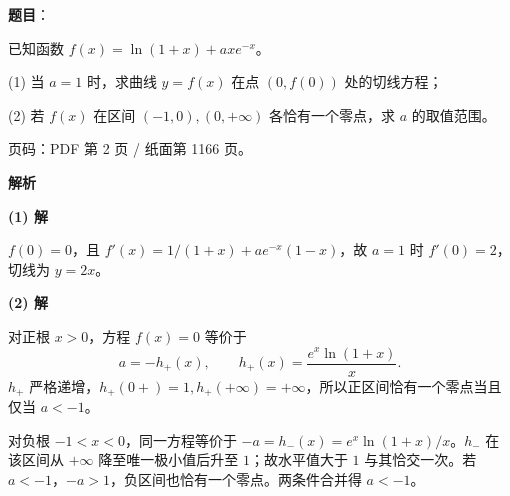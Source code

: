 \begin{answer}

\textbf{题目}：

已知函数 $f(x)=\ln(1+x)+axe^{-x}$。

  (1) 当 $a=1$ 时，求曲线 $y=f(x)$ 在点 $(0,f(0))$ 处的切线方程；

  (2) 若 $f(x)$ 在区间 $(-1,0),(0,+\infty)$ 各恰有一个零点，求 $a$ 的取值范围。

\begin{gktip}
页码：PDF 第 2 页 / 纸面第 1166 页。
\end{gktip}

\textbf{解析}

\textbf{(1) 解}

$f(0)=0$，且 $f'(x)=1/(1+x)+ae^{-x}(1-x)$，故 $a=1$ 时 $f'(0)=2$，切线为 $y=2x$。

\textbf{(2) 解}

对正根 $x>0$，方程 $f(x)=0$ 等价于
\nopagebreak[4]
\[
a=-h_+(x),\qquad h_+(x)=\frac{e^x\ln(1+x)}x.
\]
$h_+$ 严格递增，$h_+(0+)=1,h_+(+\infty)=+\infty$，所以正区间恰有一个零点当且仅当 $a<-1$。

对负根 $-1<x<0$，同一方程等价于 $-a=h_-(x)=e^x\ln(1+x)/x$。$h_-$ 在该区间从 $+\infty$ 降至唯一极小值后升至 $1$；故水平值大于 $1$ 与其恰交一次。若 $a<-1$，$-a>1$，负区间也恰有一个零点。两条件合并得 $a<-1$。



\end{answer}
